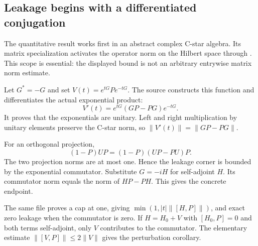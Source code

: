 \subsection{Leakage begins with a differentiated conjugation}
The quantitative result works first in an abstract complex C-star algebra. Its matrix specialization activates the operator norm on the Hilbert space through . This scope is essential: the displayed bound is not an arbitrary entrywise matrix norm estimate.

Let $G^*=-G$ and set $V(t)=e^{tG}Pe^{-tG}$. The source constructs this function and differentiates the actual exponential product:
\[
V'(t)=e^{tG}(GP-PG)e^{-tG}.
\]
It proves that the exponentials are unitary. Left and right multiplication by unitary elements preserve the C-star norm, so $\|V'(t)\|=\|GP-PG\|$.



For an orthogonal projection,
\[
(1-P)UP=(1-P)(UP-PU)P.
\]
The two projection norms are at most one. Hence the leakage corner is bounded by the exponential commutator. Substitute $G=-iH$ for self-adjoint $H$. Its commutator norm equals the norm of $HP-PH$. This gives the concrete endpoint.



The same file proves a cap at one, giving $\min(1,|t|\|[H,P]\|)$, and exact zero leakage when the commutator is zero. If $H=H_0+V$ with $[H_0,P]=0$ and both terms self-adjoint, only $V$ contributes to the commutator. The elementary estimate $\|[V,P]\|\le2\|V\|$ gives the perturbation corollary.

